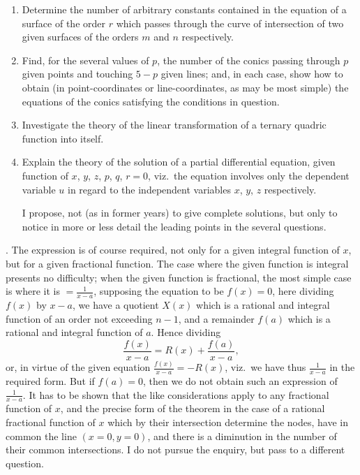 \documentclass[11pt,a4paper]{article}
\begin{document}
\begin{enumerate}[label=\arabic*.,leftmargin=*]
\item Determine the number of arbitrary constants contained in the equation of a surface of the order $r$ which passes through the curve of intersection of two given surfaces of the orders $m$ and $n$ respectively.

\item Find, for the several values of $p$, the number of the conics passing through $p$ given points and touching $5 - p$ given lines; and, in each case, show how to obtain (in point-coordinates or line-coordinates, as may be most simple) the equations of the conics satisfying the conditions in question.

\item Investigate the theory of the linear transformation of a ternary quadric function into itself.

\item Explain the theory of the solution of a partial differential equation, given function of $x$, $y$, $z$, $p$, $q$, $r = 0$, viz.\ the equation involves only the dependent variable $u$ in regard to the independent variables $x$, $y$, $z$ respectively.

I propose, not (as in former years) to give complete solutions, but only to notice in more or less detail the leading points in the several questions.
\end{enumerate}

\medskip

. The expression is of course required, not only for a given integral function of $x$, but for a given fractional function. The case where the given function is integral presents no difficulty; when the given function is fractional, the most simple case is where it is $= \frac{1}{x - a}$, supposing the equation to be $f(x) = 0$, here dividing $f(x)$ by $x - a$, we have a quotient $X(x)$ which is a rational and integral function of an order not exceeding $n - 1$, and a remainder $f(a)$ which is a rational and integral function of $a$. Hence dividing
\[
\frac{f(x)}{x - a} = R(x) + \frac{f(a)}{x - a},
\]
or, in virtue of the given equation $\frac{f(x)}{x - a} = -R(x)$, viz.\ we have thus $\frac{1}{x - a}$ in the required form. But if $f(a) = 0$, then we do not obtain such an expression of $\frac{1}{x - a}$.
It has to be shown that the like considerations apply to any fractional function of $x$, and the precise form of the theorem in the case of a rational fractional function of $x$ which by their intersection determine the nodes, have in common the line $(x = 0, y = 0)$, and there is a diminution in the number of their common intersections. I do not pursue the enquiry, but pass to a different question.
\end{document}
